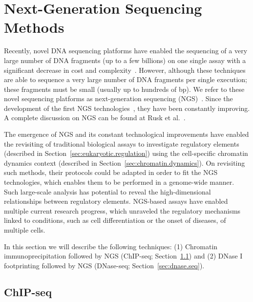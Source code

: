 \section{Next-Generation Sequencing Methods}
\label{sec:ngs.methods}

Recently, novel DNA sequencing platforms have enabled the sequencing of a very large number of DNA fragments (up to a few billions) on one single assay with a significant decrease in cost and complexity~\cite{hayden2014}. However, although these techniques are able to sequence a very large number of DNA fragments per single execution; these fragments must be small (usually up to hundreds of bp). We refer to these novel sequencing platforms as next-generation sequencing (NGS)~\cite{shendure2008}. Since the development of the first NGS technologies~\cite{tucker2009}, they have been constantly improving. A complete discussion on NGS can be found at Rusk et al.~\cite{rusk2010}.

The emergence of NGS and its constant technological improvements have enabled the revisiting of traditional biological assays to investigate regulatory elements (described in Section~\ref{sec:eukaryotic.regulation}) using the cell-specific chromatin dynamics context (described in Section~\ref{sec:chromatin.dynamics}). On revisiting such methods, their protocols could be adapted in order to fit the NGS technologies, which enables them to be performed in a genome-wide manner. Such large-scale analysis has potential to reveal the high-dimensional relationships between regulatory elements. NGS-based assays have enabled multiple current research progress, which unraveled the regulatory mechanisms linked to conditions, such as cell differentiation or the onset of diseases, of multiple cells.

In this section we will describe the following techniques: (1) Chromatin immunoprecipitation followed by NGS (ChIP-seq; Section~\ref{sec:chip.seq}) and (2) DNase I footprinting followed by NGS (DNase-seq; Section~\ref{sec:dnase.seq}).

\subsection{ChIP-seq}
\label{sec:chip.seq}


